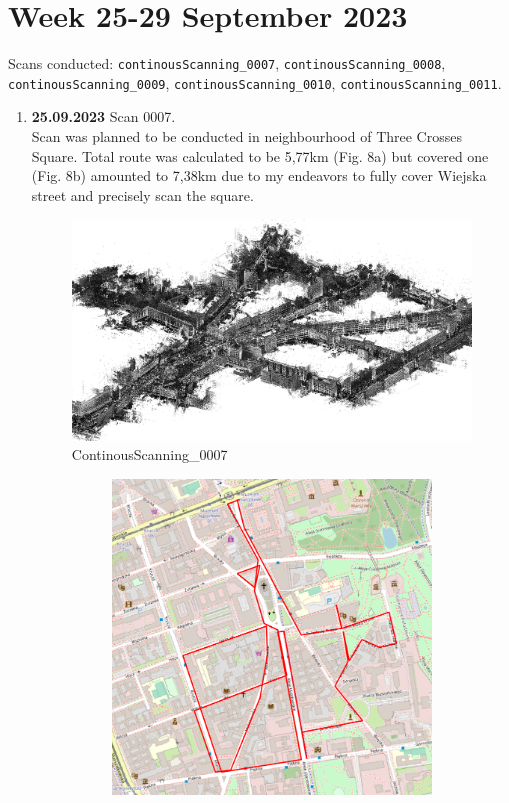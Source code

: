 \documentclass[a4paper,12pt]{book}
\begin{document}
\section{Week 25-29 September 2023} 
Scans conducted: \verb|continousScanning_0007|, \verb|continousScanning_0008|, \verb|continousScanning_0009|, \verb|continousScanning_0010|, \verb|continousScanning_0011|.\\
\begin{enumerate}
	\item \textbf{25.09.2023} Scan 0007. \\
	Scan was planned to be conducted in neighbourhood of Three Crosses Square. Total route was calculated to be 5,77km (Fig. 8a) but covered one (Fig. 8b) amounted to 7,38km due to my endeavors to fully cover Wiejska street and precisely scan the square.
	\begin{figure}[H]
		\includegraphics[width=1\linewidth]{cloud7}
		\caption{ContinousScanning\_0007}
	\end{figure}
	\begin{figure}[H]
		\centering
		\begin{subfigure}{.75\textwidth}
			\centering
			\includegraphics[width=1\linewidth]{route_p7}

\end{subfigure}
\end{figure}
\end{enumerate}
\end{document}
